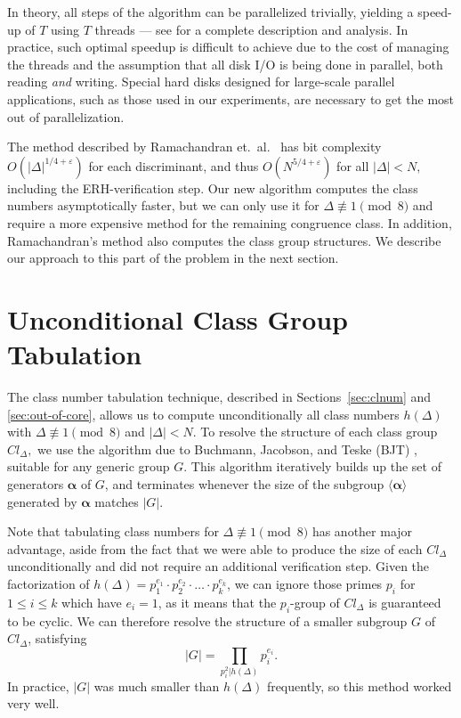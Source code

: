 \documentclass{mcom-l}
\theoremstyle{definition}
\begin{document}
In theory, all steps of the algorithm can be parallelized trivially,
yielding a speed-up of $T$ using $T$ threads --- see
\cite[Chapter~4]{mosunov1} for a complete description and analysis.
In practice, such optimal speedup is difficult to achieve due to the
cost of managing the threads and the assumption that all disk I/O is
being done in parallel, both reading \emph{and} writing.  Special hard
disks designed for large-scale parallel applications, such as those
used in our experiments, are necessary to get the most out of
parallelization.

The method described by Ramachandran
et.\ al.\ \cite{jacobson,ramachandran} has bit complexity
$O(|\Delta|^{1/4+\varepsilon})$ for each discriminant, and thus
$O(N^{5/4+\varepsilon})$ for all $|\Delta| < N,$ including the
ERH-verification step.  Our new algorithm computes the class numbers
asymptotically faster, but we can only use it for $\Delta \not \equiv
1 \pmod{8}$ and require a more expensive method for the remaining
congruence class.  In addition, Ramachandran's method also computes
the class group structures.  We describe our approach to this part of
the problem in the next section.

\section{Unconditional Class Group Tabulation} \label{sec:clgrp}

The class number tabulation technique, described in
Sections~\ref{sec:clnum} and \ref{sec:out-of-core}, allows us to
compute unconditionally all class numbers $h(\Delta)$ with $\Delta
\not \equiv 1 \pmod{8}$ and $|\Delta| < N$. To resolve the structure
of each class group $Cl_\Delta,$ we use the algorithm due to Buchmann,
Jacobson, and Teske (BJT) \cite[Algorithm 4.1]{buchmann}, suitable for
any generic group $G$. This algorithm iteratively builds up the set of
generators $\bm{\alpha}$ of $G$, and terminates whenever the size of
the subgroup $\langle \bm{\alpha} \rangle$ generated by $\bm{\alpha}$
matches $|G|$.

Note that tabulating class numbers for $\Delta \not \equiv 1
\pmod{8}$ has another major advantage, aside from the fact that we
were able to produce the size of each $Cl_\Delta$ unconditionally and
did not require an additional verification step. Given the
factorization of $h(\Delta) = p_1^{e_1}\cdot p_2^{e_2} \cdot \ldots
\cdot p_k^{e_k}$, we can ignore those primes $p_i$ for $1 \leq i
\leq k$ which have $e_i = 1$, as it means that the $p_i$-group of
$Cl_\Delta$ is guaranteed to be cyclic. We can therefore resolve
the structure of a smaller subgroup $G$ of $Cl_\Delta$, satisfying
$$
|G| = \prod\limits_{p_i^2 | h(\Delta)} p_i^{e_i}.
$$
In practice, $|G|$ was much smaller than $h(\Delta)$ frequently, so
this method worked very well.
\end{document}
